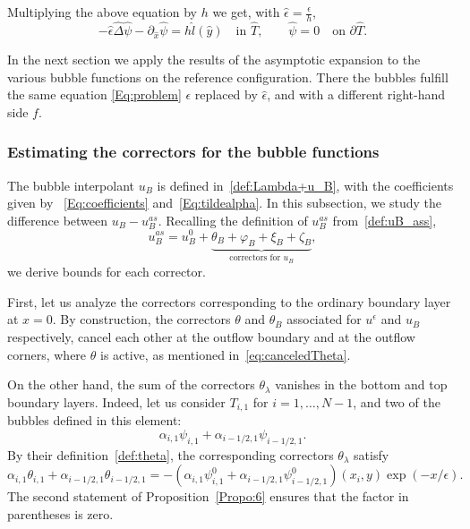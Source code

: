 \documentclass{article}
\newcommand{\ueps}{u^\epsilon}
\newcommand{\uBas}{\ensuremath{u_B^{as}}\xspace}
\begin{document}
Multiplying the above equation by $h$ we get, 
with $\hat{\epsilon}=\frac{\epsilon}{h}$,
\begin{equation}\label{eq:defHAtPsi}
-\hat{\epsilon} \hat{\Delta} \hat{\psi} - \partial_{\hat{x}}\hat{\psi} = h\hat{l}(\hat{y})\quad \text{in }\hat{T},\qquad
   \hat{\psi} = 0\quad\text{on }\partial\hat{T}.
\end{equation}

In the next section we apply the results of the asymptotic expansion to the various bubble functions
on the reference configuration. There the bubbles fulfill the same equation \eqref{Eq:problem} $\epsilon$ replaced by $\hat{\epsilon}$, and with a different right-hand side $f$.

\subsubsection{Estimating the correctors for the bubble functions}\label{Sec:correctors}

The bubble interpolant $u_B$ is defined in~\eqref{def:Lambda+u_B}, with the coefficients given by ~\eqref{Eq:coefficients} and~\eqref{Eq:tildealpha}.
In this subsection, 
we study the difference between $u_B - \uBas$.
Recalling the definition of \uBas from~\eqref{def:uB_ass},
\[
\uBas = u_B^0 + \underbrace{\theta_B+ \varphi_B +\xi_B + \zeta_B}_{\text{correctors for }u_B},
\]
we derive bounds for each corrector.

First, let us analyze the correctors corresponding to the ordinary boundary layer at $x=0$.
By construction, the correctors $\theta$ and $\theta_B$ associated for $\ueps$ and $u_B$ respectively, cancel each other at the outflow boundary and at the outflow corners, where $\theta$ is active, as mentioned in~\eqref{eq:canceledTheta}.

On the other hand, the sum of the correctors $\theta_\lambda$ vanishes in the bottom and top boundary layers. Indeed, let us consider $T_{i,1}$ for $i=1,\ldots,N-1$, and two of the bubbles defined in this element:
\begin{equation*}
    \alpha_{i,1}\psi_{i,1} + \alpha_{i-1/2,1}\psi_{i-1/2,1}.     
\end{equation*}
By their definition~\eqref{def:theta}, the corresponding correctors $\theta_\lambda$ satisfy
\begin{equation*}
    \alpha_{i,1}\theta_{i,1} + \alpha_{i-1/2,1}\theta_{i-1/2,1} = 
    -(\alpha_{i,1}\psi_{i,1}^0 + \alpha_{i-1/2,1}\psi_{i-1/2,1}^0 ) (x_i,y)\exp(-x/\epsilon).
\end{equation*}
The second statement of Proposition~\ref{Propo:6} ensures that the factor in parentheses is zero.
\end{document}
